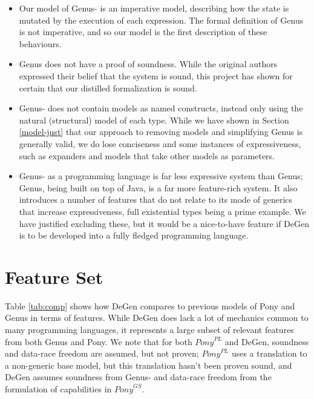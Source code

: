 \begin{itemize}
    \item Our model of Genus- is an imperative model, describing how the state is mutated by the execution of each expression. The formal definition of Genus is not imperative, and so our model is the first description of these behaviours.
    \item Genus does not have a proof of soundness. While the original authors expressed their belief that the system is sound, this project has shown for certain that our distilled formalization is sound. 
    \item Genus- does not contain models as named constructs, instead only using the natural (structural) model of each type. While we have shown in Section \ref{model-just} that our approach to removing models and simplifying Genus is generally valid, we do lose conciseness and some instances of expressiveness, such as expanders and models that take other models as parameters.
    \item Genus- as a programming language is far less expressive system than Genus; Genus, being built on top of Java, is a far more feature-rich system. It also introduces a number of features that do not relate to its mode of generics that increase expressiveness, full existential types being a prime example. We have justified excluding these, but it would be a nice-to-have feature if DeGen is to be developed into a fully fledged programming language.
    
\end{itemize}


\section{Feature Set}

Table \ref{tab:comp} shows how DeGen compares to previous models of Pony and Genus in terms of features. While DeGen does lack a lot of mechanics common to many programming languages, it represents a large subset of relevant features from both Genus and Pony. We note that for both $\textit{Pony}^{PL}$ and DeGen, soundness and data-race freedom are assumed, but not proven; $\textit{Pony}^{PL}$ uses a translation to a non-generic base model, but this translation hasn't been proven sound, and DeGen assumes soundness from Genus- and data-race freedom from the formulation of capabilities in $\textit{Pony}^{GS}$.

